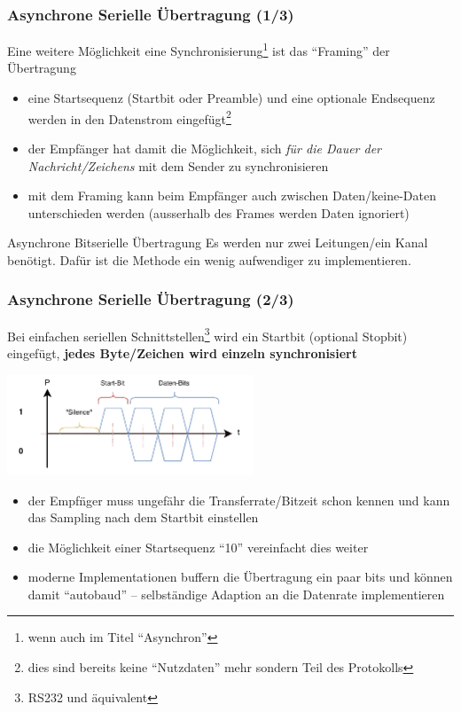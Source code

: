 \documentclass[ignorenonframetext]{beamer}
\begin{document}
\begin{frame}
\frametitle{Asynchrone Serielle \"Ubertragung (1/3)}
Eine weitere M\"oglichkeit eine Synchronisierung\footnote{wenn auch im Titel ``Asynchron''} ist das ``Framing'' der \"Ubertragung

\begin{itemize}
\item eine Startsequenz (Startbit oder Preamble) und eine optionale Endsequenz werden in den Datenstrom eingef\"ugt\footnote{dies sind bereits keine ``Nutzdaten'' mehr sondern Teil des Protokolls}
\item der Empf\"anger hat damit die M\"oglichkeit, sich \emph{f\"ur die Dauer der Nachricht/Zeichens} mit dem Sender zu synchronisieren
\item mit dem Framing kann beim Empf\"anger auch zwischen Daten/keine-Daten unterschieden werden (ausserhalb des Frames werden Daten ignoriert)
\end{itemize}
\begin{block}{Asynchrone Bitserielle \"Ubertragung}
Es werden nur zwei Leitungen/ein Kanal ben\"otigt. Daf\"ur ist die Methode ein wenig aufwendiger zu implementieren.
\end{block}
\end{frame}



\begin{frame}
\frametitle{Asynchrone Serielle \"Ubertragung (2/3)}
Bei einfachen seriellen Schnittstellen\footnote{RS232 und \"aquivalent} wird ein Startbit (optional Stopbit) eingef\"ugt, {\bfseries jedes Byte/Zeichen wird einzeln synchronisiert}

\includegraphics[height=3cm]{asynchron-startbit}
\begin{itemize}
\item der Empf\"nger muss ungef\"ahr die Transferrate/Bitzeit schon kennen und kann das Sampling nach dem Startbit einstellen
\item die M\"oglichkeit einer Startsequenz ``10'' vereinfacht dies weiter
\item moderne Implementationen buffern die \"Ubertragung ein paar bits und k\"onnen damit ``autobaud'' -- selbst\"andige Adaption an die Datenrate implementieren
\end{itemize}
\end{frame}
\end{document}
